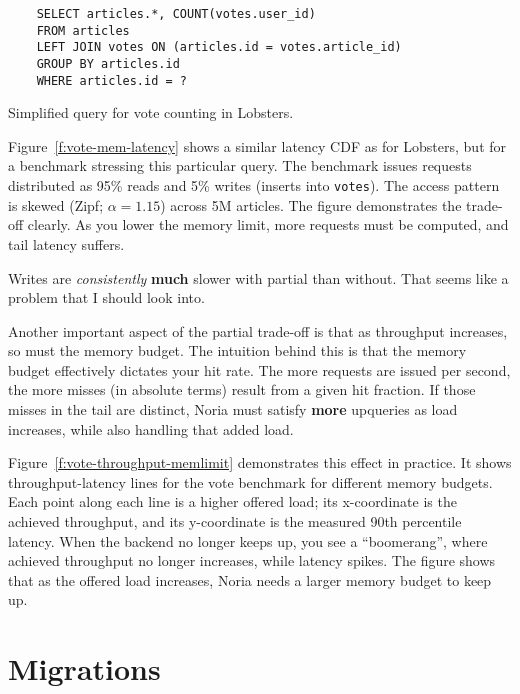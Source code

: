 \begin{listing}[h]
  \begin{verbatim}
    SELECT articles.*, COUNT(votes.user_id)
    FROM articles
    LEFT JOIN votes ON (articles.id = votes.article_id)
    GROUP BY articles.id
    WHERE articles.id = ?
  \end{verbatim}
  \caption{Simplified query for vote counting in Lobsters.}
  \label{l:votes}
\end{listing}

Figure~\ref{f:vote-mem-latency} shows a similar latency CDF as for Lobsters, but
for a benchmark stressing this particular query. The benchmark issues requests
distributed as 95\% reads and 5\% writes (inserts into \texttt{votes}). The
access pattern is skewed (Zipf; $\alpha = 1.15$) across 5M articles. The figure
demonstrates the trade-off clearly. As you lower the memory limit, more requests
must be computed, and tail latency suffers.

\begin{inprogress}
  Writes are \textit{consistently} \textbf{much} slower with partial than
  without. That seems like a problem that I should look into.
\end{inprogress}

Another important aspect of the partial trade-off is that as throughput
increases, so must the memory budget. The intuition behind this is that the
memory budget effectively dictates your hit rate. The more requests are issued
per second, the more misses (in absolute terms) result from a given hit
fraction. If those misses in the tail are distinct, Noria must satisfy
\textbf{more} upqueries as load increases, while also handling that added load.

Figure~\ref{f:vote-throughput-memlimit} demonstrates this effect in practice. It
shows throughput-latency lines for the vote benchmark for different memory
budgets. Each point along each line is a higher offered load; its x-coordinate
is the achieved throughput, and its y-coordinate is the measured 90th percentile
latency. When the backend no longer keeps up, you see a ``boomerang'', where
achieved throughput no longer increases, while latency spikes. The figure shows
that as the offered load increases, Noria needs a larger memory budget to keep
up.

\section{Migrations}
\label{s:eval:cost:mig}

